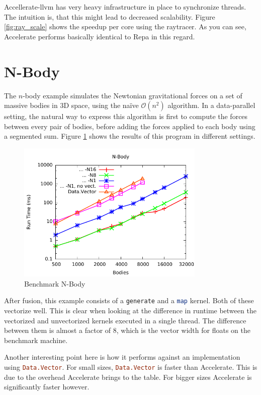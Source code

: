 \documentclass[a4paper,bibliography=totocnumbered,parskip,headsepline]{scrbook}
\begin{document}
Accellerate-llvm has very heavy infrastructure in place to synchronize threads.
The intuition is, that this might lead to decreased scalability.
Figure \ref{fig:ray_scale} shows the speedup per core using the raytracer.
As you can see, Accelerate performs basically identical to Repa in this regard.

\section{N-Body}
The $n$-body example simulates the Newtonian gravitational forces on a set of massive bodies in 3D space, using the na\"ive $\mathcal{O}\left( n^{2} \right)$ algorithm.
In a data-parallel setting, the natural way to express this algorithm is first to compute the forces between every pair of bodies, before adding the forces applied to each body using a segmented sum.
Figure \ref{fig:nbody} shows the results of this program in different settings.

\begin{figure}
    \centering
    \includegraphics[width=0.8\textwidth]{images/benchmarks/nbody/nbody}
    \caption{Benchmark N-Body}
    \label{fig:nbody}
\end{figure}

After fusion, this example consists of a \lstinline[language=haskell]!generate! and a \lstinline[language=haskell]!map! kernel.
Both of these vectorize well.
This is clear when looking at the difference in runtime between the vectorized and unvectorized kernels executed in a single thread.
The difference between them is almost a factor of 8, which is the vector width for floats on the benchmark machine.

Another interesting point here is how it performs against an implementation using \lstinline[language=haskell]!Data.Vector!.
For small sizes, \lstinline[language=haskell]!Data.Vector! is faster than Accelerate.
This is due to the overhead Accelerate brings to the table.
For bigger sizes Accelerate is significantly faster however.
\end{document}
